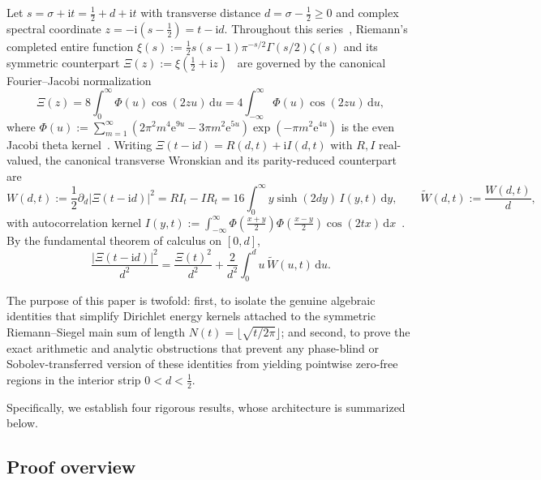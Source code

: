 \documentclass[11pt,reqno]{amsart}
\theoremstyle{definition}
\theoremstyle{remark}
\numberwithin{equation}{section}
\newcommand{\dd}{\,\mathrm{d}}
\newcommand{\ii}{\mathrm{i}}
\newcommand{\ee}{\mathrm{e}}
\begin{document}
Let $s = \sigma + \ii t = \frac{1}{2} + d + \ii t$ with transverse distance $d = \sigma - \frac{1}{2} \ge 0$ and complex spectral coordinate $z = -\ii(s - \frac{1}{2}) = t - \ii d$. Throughout this series~\cite{missiaen2026p5,missiaen2026p6,missiaen2026p7}, Riemann's completed entire function $\xi(s) := \frac{1}{2}s(s-1)\pi^{-s/2}\Gamma(s/2)\zeta(s)$ and its symmetric counterpart $\Xi(z) := \xi(\frac{1}{2} + \ii z)$~\cite{riemann1859,titchmarsh1986} are governed by the canonical Fourier--Jacobi normalization
\begin{equation}\label{eq:canonical_xi}
\Xi(z) = 8\int_{0}^{\infty} \Phi(u)\cos(2zu)\dd u = 4\int_{-\infty}^{\infty} \Phi(u)\cos(2zu)\dd u,
\end{equation}
where $\Phi(u) := \sum_{m=1}^{\infty}(2\pi^2 m^4\ee^{9u} - 3\pi m^2\ee^{5u})\exp(-\pi m^2\ee^{4u})$ is the even Jacobi theta kernel~\cite{jacobi1829,polya1926}. Writing $\Xi(t - \ii d) = R(d,t) + \ii I(d,t)$ with $R, I$ real-valued, the canonical transverse Wronskian and its parity-reduced counterpart are
\begin{equation}\label{eq:canonical_wronskian}
W(d,t) := \frac{1}{2}\partial_d\bigl\lvert\Xi(t - \ii d)\bigr\rvert^2 = R I_t - I R_t = 16\int_{0}^{\infty} y\sinh(2dy)\,I(y,t)\dd y, \qquad \widetilde{W}(d,t) := \frac{W(d,t)}{d},
\end{equation}
with autocorrelation kernel $I(y,t) := \int_{-\infty}^{\infty} \Phi(\frac{x+y}{2})\Phi(\frac{x-y}{2})\cos(2tx)\dd x$~\cite{wigner1932}. By the fundamental theorem of calculus on $[0, d]$,
\begin{equation}\label{eq:ftc_energy}
\frac{\bigl\lvert\Xi(t - \ii d)\bigr\rvert^2}{d^2} = \frac{\Xi(t)^2}{d^2} + \frac{2}{d^2}\int_{0}^{d} u\,\widetilde{W}(u,t)\dd u.
\end{equation}

The purpose of this paper is twofold: first, to isolate the genuine algebraic identities that simplify Dirichlet energy kernels attached to the symmetric Riemann--Siegel main sum of length $N(t) = \lfloor\sqrt{t/2\pi}\rfloor$; and second, to prove the exact arithmetic and analytic obstructions that prevent any phase-blind or Sobolev-transferred version of these identities from yielding pointwise zero-free regions in the interior strip $0 < d < \frac{1}{2}$.

Specifically, we establish four rigorous results, whose architecture is summarized below.

\subsection{Proof overview}\label{subsec:proof_overview}
\end{document}
